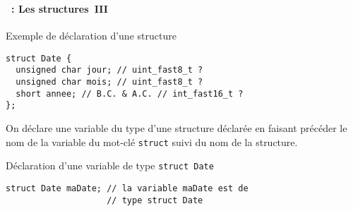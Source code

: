 \begin{frame}[containsverbatim]
  \frametitle{\secname}
  \framesubtitle{\subsecname~: Les structures~III} 

  \begin{exampleblock}{Exemple de déclaration d'une structure}
    \begin{verbatim}
struct Date {
  unsigned char jour; // uint_fast8_t ?
  unsigned char mois; // uint_fast8_t ?
  short annee; // B.C. & A.C. // int_fast16_t ?
};\end{verbatim}    
  \end{exampleblock}
  \vspace{0.3cm}
  \par
  On déclare une variable du type d'une structure déclarée en faisant précéder le nom de la variable du mot-clé 
  \verb|struct| suivi du nom de la structure.
  
  \begin{exampleblock}{Déclaration d'une variable de type \texttt{struct Date}}
    \begin{verbatim}
struct Date maDate; // la variable maDate est de 
                    // type struct Date\end{verbatim}
  \end{exampleblock}
\end{frame}

